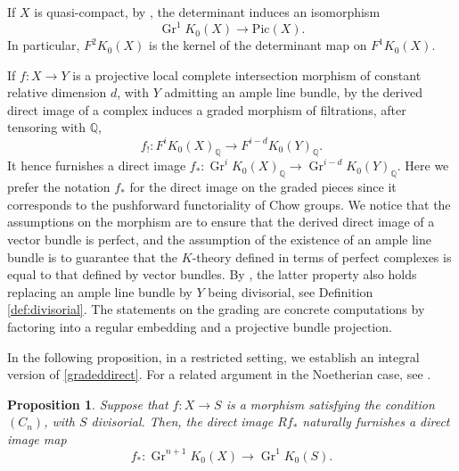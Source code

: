 \documentclass[JEP,XML,SOM,Unicode,published]{cedram}
\theoremstyle{plain}
\newtheorem{proposition}[theorem]{Proposition}
\theoremstyle{definition}
\newcommand{\QBbb}{\mathbb Q}
\newcommand{\Pic}{\mathrm{Pic}}
\DeclareMathOperator{\Gr}{Gr}
\begin{document}
If $X$ is quasi-compact, by \cite[Exp.\,X, Th.\,5.3.2]{SGA6}, the determinant induces an isomorphism
\begin{equation}\label{iso:GR1}
\Gr^1 K_0(X)\to \Pic(X).
\end{equation}
In particular, $F^{2}K_{0}(X)$ is the kernel of the determinant map on $F^{1}K_{0}(X)$.

If $f: X \to Y$ is a projective local complete intersection morphism of constant relative dimension $d$, with $Y$ admitting an ample line bundle, by \cite[Exp.\,VIII, Prop.\,3.2]{SGA6} the derived direct image of a complex induces a graded morphism of filtrations, after tensoring with $\QBbb$,
\begin{equation}\label{gradeddirect}
f_!: F^i K_0(X)_\QBbb \to F^{i-d}K_0(Y)_\QBbb.
\end{equation}
It hence furnishes a direct image $f_\ast: \Gr^iK_0(X)_{\QBbb}\to \Gr^{i-d}K_0(Y)_\QBbb$. Here we prefer the notation $f_{\ast}$ for the direct image on the graded pieces since it corresponds to the pushforward functoriality of Chow groups. We notice that the assumptions on the morphism are to ensure that the derived direct image of a vector bundle is perfect, and the assumption of the existence of an ample line bundle is to guarantee that the $K$-theory defined in terms of perfect complexes is equal to that defined by vector bundles. By \cite[Prop.\,3.10]{ThomasonTrobaugh}, the latter property also holds replacing an ample line bundle by $Y$ being divisorial, see Definition \ref{def:divisorial}. The statements on the grading are concrete computations by factoring into a regular embedding and a projective bundle projection.

In the following proposition, in a restricted setting, we establish an integral version of \eqref{gradeddirect}. For a related argument in the Noetherian case, see \cite[Prop.\,2.25]{Nakayamaintsheaves}.

\begin{proposition}\label{prop:directimageK}
Suppose that $f: X\to S$ is a morphism satisfying the condition $(C_n)$, with $S$ divisorial. Then, the direct image $Rf_\ast$ naturally furnishes a direct image map\vspace*{-3pt}
\begin{displaymath} f_\ast : \Gr^{n+1} K_0(X) \to \Gr^1 K_0(S).
\end{displaymath}
\end{proposition}
\end{document}
